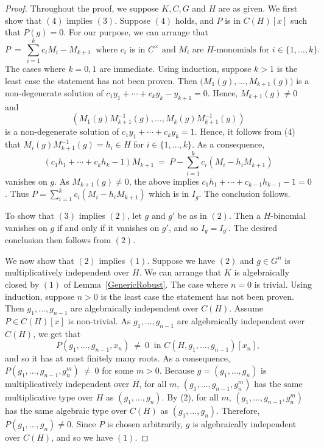 \begin{proof}

Throughout the proof, we suppose $K, C, G$ and $H$ are as given. We first show that $(4)$ implies $(3)$.
%
Suppose \((4)\) holds, and \(P\) is in \(C(H)[x] \) such that \(P(g)=0\). 
For our purpose, we can arrange that
$$P\ =\ \sum_{i=1}^{k} c_iM_i- M_{k+1}\ \text{ where } c_i \text{ is in } C^\times \text{ and } M_i \text{ are } H\text{-monomials for } i \in \{1, \ldots, k\}.$$ 
%
The cases where $k=0, 1$ are immediate. Using induction, suppose $k>1$ is the least case the statement has not been proven.
%
Then \( \big( M_1(g), \ldots, M_{k+1}(g)\big)\) is a non-degenerate solution of \( c_1y_1+ \cdots+ c_{k}y_{k} - y_{k+1} =0 \).
%
Hence, $M_{k+1}(g) \neq 0$ and 
$$ \left( M_1(g)M_{k+1}^{-1}(g), \ldots, M_{k}(g)M_{k+1}^{-1}(g) \right) $$
is a non-degenerate solution of $c_1y_1+ \cdots+c_{k}y_{k} = 1 $.
%
Hence, it follows from (4) that  $M_i(g) M_{k+1}^{-1}(g) = h_i \in H$ for $i \in \{ 1,  \ldots, k\}$.
%
As a consequence,  $$( c_1h_1+ \cdots+ c_{k}h_{k} - 1) M_{k+1} \ =\ P - \sum_{i=1}^{k}c_i(M_i-h_iM_{k+1}) $$ vanishes on $g$. 
%
As $M_{k+1}(g) \neq 0$, the above implies $c_1h_1+ \cdots+ c_{k-1}h_{k-1} - 1 =0$. Thus 
$P = \sum_{i=1}^{k}c_i(M_i-h_iM_{k+1})$ which is in $I_g$. The conclusion follows.

To show that $(3)$ implies $(2)$, let $g$ and $g'$ be as in $(2)$.
%
Then a $H$-binomial vanishes on \(g\) if and only if it vanishes on \( g'\), and so \( I_g =I_{g'}\). 
%
The desired conclusion then follows from \( (2) \).


We now show that $(2)$ implies $(1)$.
%
Suppose we have \((2)\) and $g\in G^n$ is multiplicatively independent over $H$. 
%
We can arrange that \(K\) is algebraically closed by $(1)$ of Lemma~\ref{GenericRobust}. 
%
The case where $n=0$ is trivial.
%
Using induction, suppose $n>0$ is the least case the statement has not been proven. 
%
Then $g_1, \ldots, g_{n-1}$ are algebraically independent over $C(H)$.
%
Assume \(P \in C(H)[x]\) is non-trivial. 
%
As \( g_1, \ldots, g_{n-1} \) are algebraically independent over \(C(H)\), we get that 
$$P(g_1, \ldots, g_{n-1}, x_n)\ \neq\ 0 \ \text{ in } C(H, g_1, \ldots, g_{n-1})[x_n],$$ and so it has at most finitely many roots. 
%
As a consequence, \( P(g_1, \ldots, g_{n-1}, g_n^m) \ \neq\  0 \) for some $m > 0$. 
%
Because \(g = (g_1, \ldots, g_n)\) is multiplicatively independent over \(H\), for all $m$, \((g_1, \ldots, g_{n-1},g_n^m)\) has the same multiplicative type over \(H\) as \((g_1, \ldots, g_n)\). By (2), for all $m$, \((g_1, \ldots, g_{n-1}, g_n^m)\) has the same algebraic type over $C(H)$ as \((g_1, \ldots, g_n)\).
%
Therefore, \(P(g_1, \ldots, g_n) \neq 0\). Since \(P\) is chosen arbitrarily, \(g\) is algebraically independent over \( C(H)\), and so we have \((1) \).


\end{proof}
